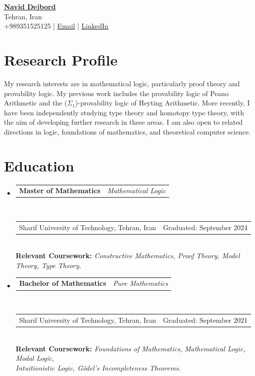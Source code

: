 \documentclass[11pt,a4paper]{article}
\makeatletter
\newcommand{\cvrow}[2]{%
  \noindent\begin{tabularx}{\textwidth}{@{}X>{\raggedleft\arraybackslash}p{0.31\textwidth}@{}}
    #1 & #2
  \end{tabularx}%
}
\makeatother
\begin{document}
\begin{center}
  {\LARGE\bfseries \href{https://naviddejbord.github.io/}{Navid Dejbord}}\\[0.55em]
  {\large Tehran, Iran}\\[0.45em]
  {\large +989351525125 \;|\; \href{mailto:navid.dejbord@gmail.com}{Email} \;|\; \href{https://linkedin.com/in/Naviddejbord}{LinkedIn}}
\end{center}

\section{Research Profile}
My research interests are in mathematical logic, particularly proof theory and provability logic. My previous work includes the provability logic of Peano Arithmetic and the ($\Sigma_1$)-provability logic of Heyting Arithmetic. More recently, I have been independently studying type theory and homotopy type theory, with the aim of developing further research in these areas. I am also open to related directions in logic, foundations of mathematics, and theoretical computer science.

\section{Education}
\begin{itemize}
  \item \cvrow{\textbf{Master of Mathematics}}{\textit{Mathematical Logic}}\\[-0.15em]
  \cvrow{Sharif University of Technology, Tehran, Iran}{Graduated: September 2024}\\[-0.15em]
  \textbf{Relevant Coursework:} \textit{Constructive Mathematics, Proof Theory, Model Theory, Type Theory.}

  \item \cvrow{\textbf{Bachelor of Mathematics}}{\textit{Pure Mathematics}}\\[-0.15em]
  \cvrow{Sharif University of Technology, Tehran, Iran}{Graduated: September 2021}\\[-0.15em]
  \textbf{Relevant Coursework:} \textit{Foundations of Mathematics, Mathematical Logic, Modal Logic,}\\
  \hspace*{11.5em}\textit{Intuitionistic Logic, G\"odel's Incompleteness Theorems.}
\end{itemize}
\end{document}
